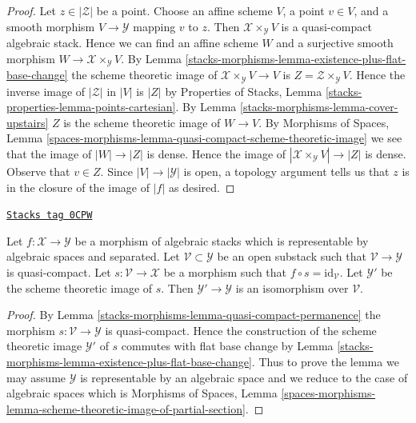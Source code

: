 \begin{proof}
Let $z \in |\mathcal{Z}|$ be a point.
Choose an affine scheme $V$, a point $v \in V$, and a smooth morphism
$V \to \mathcal{Y}$ mapping $v$ to $z$.
Then $\mathcal{X} \times_\mathcal{Y} V$ is a quasi-compact algebraic stack.
Hence we can find an affine scheme $W$ and a surjective smooth
morphism $W \to \mathcal{X} \times_\mathcal{Y} V$.
By Lemma \ref{stacks-morphisms-lemma-existence-plus-flat-base-change}
the scheme theoretic image of
$\mathcal{X} \times_\mathcal{Y} V \to V$ is
$Z = \mathcal{Z} \times_\mathcal{Y} V$.
Hence the inverse image of $|\mathcal{Z}|$ in $|V|$ is $|Z|$ by
Properties of Stacks, Lemma \ref{stacks-properties-lemma-points-cartesian}.
By Lemma \ref{stacks-morphisms-lemma-cover-upstairs} $Z$ is
the scheme theoretic image of $W \to V$.
By Morphisms of Spaces, Lemma
\ref{spaces-morphisms-lemma-quasi-compact-scheme-theoretic-image}
we see that the image of $|W| \to |Z|$ is dense.
Hence the image of $|\mathcal{X} \times_\mathcal{Y} V| \to |Z|$
is dense. Observe that $v \in Z$.
Since $|V| \to |\mathcal{Y}|$ is open, a topology argument
tells us that $z$ is in the closure of the image of $|f|$ as desired.
\end{proof}

\begin{lemma}
\label{stacks-morphisms-lemma-scheme-theoretic-image-of-partial-section}
\href{https://stacks.math.columbia.edu/tag/0CPW}{\texttt{Stacks tag 0CPW}}

Let $f : \mathcal{X} \to \mathcal{Y}$ be a morphism of algebraic stacks
which is representable by algebraic spaces and separated.
Let $\mathcal{V} \subset \mathcal{Y}$ be an open substack such that
$\mathcal{V} \to \mathcal{Y}$ is quasi-compact.
Let $s : \mathcal{V} \to \mathcal{X}$ be a morphism such that
$f \circ s = \text{id}_\mathcal{V}$.
Let $\mathcal{Y}'$ be the scheme theoretic image of $s$.
Then $\mathcal{Y}' \to \mathcal{Y}$ is an isomorphism over $\mathcal{V}$.
\end{lemma}

\begin{proof}
By Lemma \ref{stacks-morphisms-lemma-quasi-compact-permanence}
the morphism $s : \mathcal{V} \to \mathcal{Y}$ is quasi-compact.
Hence the construction of the scheme theoretic image $\mathcal{Y}'$
of $s$ commutes with flat base change by
Lemma \ref{stacks-morphisms-lemma-existence-plus-flat-base-change}.
Thus to prove the lemma
we may assume $\mathcal{Y}$ is representable by an algebraic space
and we reduce to the case of algebraic spaces which is
Morphisms of Spaces, Lemma
\ref{spaces-morphisms-lemma-scheme-theoretic-image-of-partial-section}.
\end{proof}

